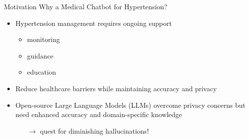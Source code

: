 \documentclass[handout]{beamer}\mode<handout>{\usetheme{AMSBolognaFC}}
\begin{document}
\begin{frame}[c]{Motivation}
    Why a Medical Chatbot for Hypertension?
    \vfill
    \begin{itemize}
        \item Hypertension management requires ongoing support
        \begin{itemize}
            \item \alert{monitoring}
            \item \alert{guidance}
            \item education
        \end{itemize}
        \item Reduce healthcare barriers while maintaining \alert{accuracy} and \alert{privacy}
        \item Open-source \alert{Large Language Models (LLMs)} overcome privacy concerns but need enhanced accuracy and domain-specific knowledge
        \begin{itemize}
            \item[$\rightarrow$] quest for diminishing \alert{hallucinations}!
        \end{itemize}
    \end{itemize}
    \vfill
\end{frame}
\end{document}
